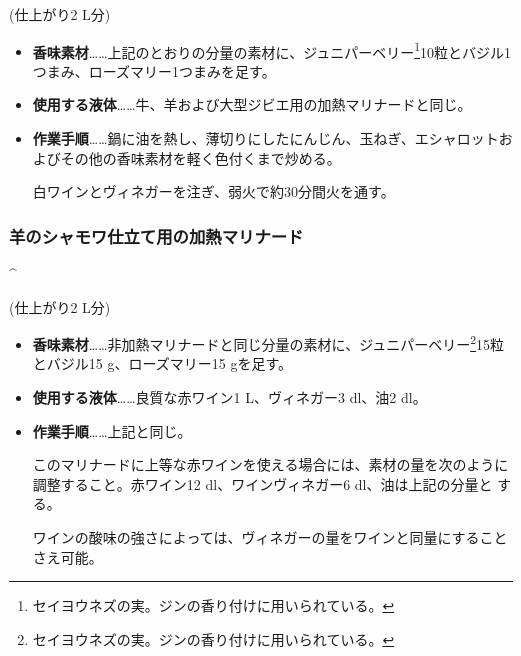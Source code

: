 \begin{recette}
(仕上がり2 L分)

\begin{itemize}
\item
  \textbf{香味素材}\ldots{}\ldots{}上記のとおりの分量の素材に、ジュニパーベリー\footnote{セイヨウネズの実。ジンの香り付けに用いられている。}10粒とバジル1つまみ、ローズマリー1つまみを足す。
\item
  \textbf{使用する液体}\ldots{}\ldots{}牛、羊および大型ジビエ用の加熱マリナードと同じ。
\item
  \textbf{作業手順}\ldots{}\ldots{}鍋に油を熱し、薄切りにしたにんじん、玉ねぎ、エシャロットおよびその他の香味素材を軽く色付くまで炒める。

  白ワインとヴィネガーを注ぎ、弱火で約30分間火を通す。
\end{itemize}

\maeaki

\hypertarget{marinade-cuite-pour-le-mouton-en-chamois}{%
\subsubsection{羊のシャモワ仕立て用の加熱マリナード}\label{marinade-cuite-pour-le-mouton-en-chamois}}

\frsub{Marinade cuite pour le mouton en chamois}{[}\^{}


(仕上がり2 L分)

\begin{itemize}
\item
  \textbf{香味素材}\ldots{}\ldots{}非加熱マリナードと同じ分量の素材に、ジュニパーベリー\footnote{セイヨウネズの実。ジンの香り付けに用いられている。}15粒とバジル15
  g、ローズマリー15 gを足す。
\item
  \textbf{使用する液体}\ldots{}\ldots{}良質な赤ワイン1\undemi{}
  L、ヴィネガー3 dl、油2\undemi{} dl。
\item
  \textbf{作業手順}\ldots{}\ldots{}上記と同じ。

  このマリナードに上等な赤ワインを使える場合には、素材の量を次のように
  調整すること。赤ワイン12 dl、ワインヴィネガー6 dl、油は上記の分量と
  する。

  ワインの酸味の強さによっては、ヴィネガーの量をワインと同量にすることさえ可能。
\end{itemize}


\end{recette}
